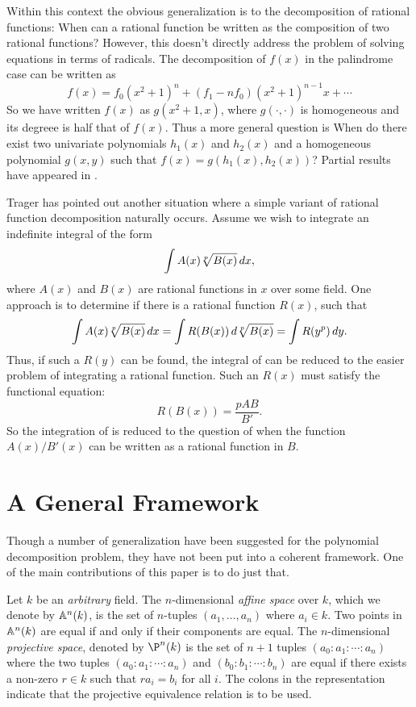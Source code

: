 Within this context the obvious generalization is to the decomposition of
rational functions: When can a rational function be written as the
composition of two rational functions?  However, this doesn't directly
address the problem of solving equations in terms of radicals.  
The decomposition of $f(x)$ in the palindrome case can be written as
\[
f(x) = f_0 (x^2+1)^n + (f_1 - n f_0)(x^2+1)^{n-1} x + \cdots 
\]
So we have written $f(x)$ as $g(x^2+1, x)$, where $g(\cdot, \cdot)$ is
homogeneous and its degreee is half that of $f(x)$.  Thus a more
general question is When do there exist two univariate polynomials $h_1(x)$
and $h_2(x)$ and a homogeneous polynomial $g(x,y)$ such that $f(x) =
g(h_1(x), h_2(x))$?  Partial results have appeared in \cite{Weiss92}.

\medskip
Trager has pointed out another situation where a simple variant of
rational function decomposition naturally occurs.  Assume we wish to
integrate an indefinite integral of the form
\begin{equation}
\label{Integral:Radical:Eq}
\int A(x) \root p \of{B(x)} \, dx,
\end{equation}
where $A(x)$ and $B(x)$ are rational functions in $x$ over some field.
One approach is to determine if there is a rational function $R(x)$,
such that
\[
\int A(x) \root p \of{B(x)} \, dx = \int R(B(x)) \, d\root p \of{B(x)}
  = \int R(y^p) \, dy.
\]
Thus, if such a $R(y)$ can be found, the integral of
 can be reduced to the easier problem of
integrating a rational function.  Such an $R(x)$ must satisfy the
functional equation:
\[
R(B(x)) = \frac{p A B}{B'}.
\]
So the integration of  is reduced to the
question of when the function $A(x)/B'(x)$ can be written as a
rational function in $B$.

\section{A General Framework}
\label{Vector:Framework:Sec}

Though a number of generalization have been suggested for the
polynomial decomposition problem, they have not been put into a
coherent framework.  One of the main contributions of this paper is to
do just that.

Let $k$ be an {\em arbitrary} field.  The $n$-dimensional {\em affine
space} over $k$, which we denote by $\mathbb{A}^n(k)$, is the set of
$n$-tuples $(a_1, \ldots, a_n)$ where $a_i \in k$.  Two points in
$\mathbb{A}^n(k)$ are equal if and only if their components are equal.  The
$n$-dimensional {\em projective space}, denoted by $\P^n(k)$ is the
set of $n+1$ tuples $(a_0: a_1: \cdots : a_n)$ where the two tuples
$(a_0: a_1: \cdots : a_n)$ and $(b_0: b_1: \cdots : b_n)$ are equal if
there exists a non-zero $r \in k$ such that $r a_i = b_i$ for all $i$.
The colons in the representation indicate that the projective
equivalence relation is to be used.

